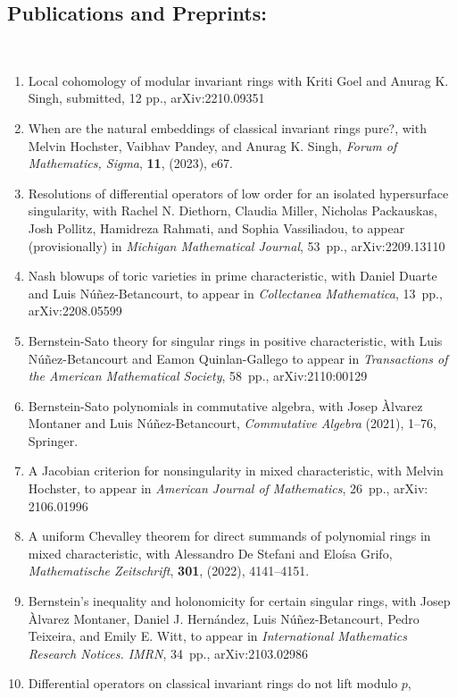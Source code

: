 \documentclass[12pt]{amsart}
\begin{document}
\subsection*{Publications and Preprints:}
\
\begin{enumerate}[leftmargin=9mm]
\item Local cohomology of modular invariant rings
with Kriti Goel and Anurag K. Singh,
submitted, 12 pp., arXiv:2210.09351
\item When are the natural embeddings of classical invariant rings pure?,
with Melvin Hochster, Vaibhav Pandey, and Anurag K. Singh,
\emph{Forum of Mathematics, Sigma}, \textbf{11}, (2023), e67.
\item Resolutions of differential operators of low order for an isolated hypersurface singularity,
with Rachel N. Diethorn, Claudia Miller, Nicholas Packauskas, Josh Pollitz, Hamidreza Rahmati, and Sophia Vassiliadou,
to appear (provisionally) in \emph{Michigan Mathematical Journal}, 53~pp., arXiv:2209.13110
\item Nash blowups of toric varieties in prime characteristic, 
with Daniel Duarte and Luis Núñez-Betancourt,
to appear in \emph{Collectanea Mathematica}, 13~pp., arXiv:2208.05599
\item Bernstein-Sato theory for singular rings in positive characteristic, 
with Luis Núñez-Betancourt and Eamon Quinlan-Gallego 
to appear in \emph{Transactions of the American Mathematical Society}, 58~pp., arXiv:2110:00129
\item Bernstein-Sato polynomials in commutative algebra, 
with Josep \`Alvarez Montaner and Luis N\'u\~nez-Betancourt,
\emph{Commutative Algebra} (2021), 1--76, Springer.
\item A Jacobian criterion for nonsingularity in mixed characteristic, 
with Melvin Hochster,
to appear in \emph{American Journal of Mathematics}, 26~pp., arXiv: 2106.01996
\item A uniform Chevalley theorem for direct summands of polynomial rings in mixed characteristic, 
with Alessandro De Stefani and Elo\'isa Grifo,
\emph{Mathematische Zeitschrift}, \textbf{301}, (2022), 4141--4151.
	\item Bernstein's inequality and holonomicity for certain singular rings,
	with Josep Àlvarez Montaner, Daniel J. Hernández, Luis Núñez-Betancourt, Pedro Teixeira, and Emily E. Witt,
to appear in \emph{International Mathematics Research Notices. IMRN}, 34~pp., arXiv:2103.02986
	\item Differential operators on classical invariant rings do not lift modulo $p$,

\end{enumerate}
\end{document}
